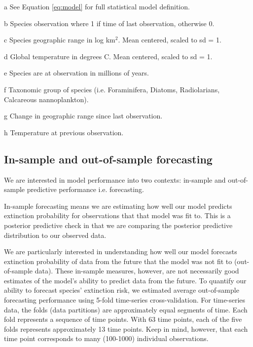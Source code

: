 \documentclass[12pt,letterpaper]{article}
\begin{document}
\begin{refsection}
\begin{table}[ht]
\begin{threeparttable}
{\begin{tabular}{ l p{3cm} l l }
        \hline
      \end{tabular}
    }
    \begin{tablenotes}
    \item[a] See Equation \ref{eq:model} for full statistical model definition.
    \item[b] Species observation where 1 if time of last observation, otherwise 0.
    \item[c] Species geographic range in log km\(^2\). Mean centered, scaled to sd = 1.
    \item[d] Global temperature in degrees C. Mean centered, scaled to sd = 1.
    \item[e] Species are at observation in millions of years.
    \item[f] Taxonomic group of species (i.e. Foraminifera, Diatoms, Radiolarians, Calcareous nannoplankton).
    \item[g] Change in geographic range since last observation.
    \item[h] Temperature at previous observation.
    \end{tablenotes}
  \end{threeparttable}
  \label{tab:model_def}
\end{table}


\subsection{In-sample and out-of-sample forecasting}

We are interested in model performance into two contexts: in-sample and out-of-sample predictive performance i.e. forecasting. 

In-sample forecasting means we are estimating how well our model predicts extinction probability for observations that that model was fit to. This is a posterior predictive check in that we are comparing the posterior predictive distribution to our observed data. 

We are particularly interested in understanding how well our model forecasts extinction probability of data from the future that the model was not fit to (out-of-sample data). These in-sample measures, however, are not necessarily good estimates of the model's ability to predict data from the future. To quantify our ability to forecast species' extinction risk, we estimated average out-of-sample forecasting performance using 5-fold time-series cross-validation. For time-series data, the folds (data partitions) are approximately equal segments of time. Each fold represents a sequence of time points. With 63 time points, each of the five folds represents approximately 13 time points. Keep in mind, however, that each time point corresponds to many (100-1000) individual observations.


\end{refsection}
\end{document}
